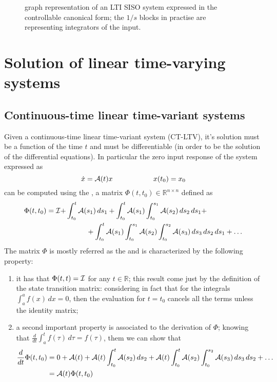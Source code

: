 		\begin{figure}[bht]
			\centering {}
			\caption{graph representation of an LTI SISO system expressed in the controllable canonical form; the $1/s$ blocks in practise are representing integrators of the input.} \label{fig:dyn:observablecanonical}
		\end{figure}
	
\section{Solution of linear time-varying systems}
	\subsection*{Continuous-time linear time-variant systems}
	Given a continuous-time linear time-variant  system (CT-LTV), it's solution must be a function of the time $t$ and must be differentiable (in order to be the solution of the differential equations). In particular the zero input response of the system expressed as
	\[ \dot x = \mathcal{A}(t) x \hspace{2cm} x(t_0 ) = x_0 \]
	can be computed using the , a matrix $\Phi(t,t_0) \in \mathds R^{n\times n}$ defined as
	\begin{equation} \label{eq:dyn:ct-statetransition}
	\begin{split}
		\Phi(t,t_0) = \mathcal{I} + & \int_{t_0}^t \mathcal{A}(s_1)\, ds_1 + \int_{t_0}^t \mathcal{A}(s_1) \int_{t_0}^{s_1} \mathcal{A}(s_2)\, ds_2\, ds_1 + \\ & \hspace{1cm}+ \int_{t_0}^t \mathcal{A}(s_1) \int_{t_0}^{s_1} \mathcal{A}(s_2) \int_{t_0}^{s_2} \mathcal{A}(s_3)\, ds_3\, ds_2\, ds_1 + \dots
	\end{split}
	\end{equation}
	The matrix $\Phi$ is mostly referred as the  and is characterized by the following property:
	\begin{enumerate}[\itshape i)]
		\item it has that $\Phi(t,t) = \mathcal{I}$ for any $t\in \mathds R$; this result come just by the definition of the state transition matrix: considering in fact that for the integrals $\int_a^a f(x)\, dx = 0$, then the evaluation for $t=t_0$ cancels all the terms unless the identity matrix;
		
		\item a second important property is associated to the derivation of $\Phi$; knowing that $\frac d{dt} \int_a^t f(\tau) \, d\tau = f(\tau)$, them we can show that
		\begin{align*}
			\frac d{dt} \Phi(t,t_0) & = 0 + \mathcal{A}(t) + \mathcal{A}(t) \int_{t_0}^t \mathcal{A}(s_2) \, ds_2 + \mathcal{A}(t) \int_{t_0}^{t} \mathcal{A}(s_2) \int_{t_0}^{s_2} \mathcal{A}(s_3)\, ds_3\, ds_2 + \dots \\
			& = \mathcal{A}(t) \Phi(t,t_0)
		\end{align*}	
	\end{enumerate}
	
